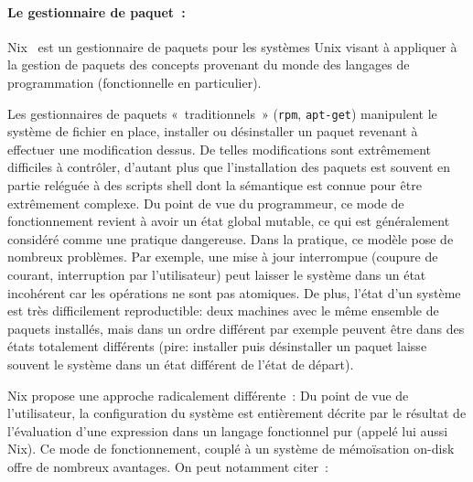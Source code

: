 \paragraph{Le gestionnaire de paquet :}

Nix \cite{phdeelco} est un gestionnaire de paquets pour les systèmes Unix visant à appliquer à
la gestion de paquets des concepts provenant du monde des langages de
programmation (fonctionnelle en particulier).

Les gestionnaires de paquets « traditionnels » (\verb|rpm|, \verb|apt-get|)
manipulent le système de fichier en place, installer ou désinstaller un paquet
revenant à effectuer une modification dessus. De telles modifications sont
extrêmement difficiles à contrôler, d'autant plus que l'installation des
paquets est souvent en partie reléguée à des scripts shell dont la sémantique
est connue pour être extrêmement complexe.
Du point de vue du programmeur, ce mode de fonctionnement revient à avoir un
état global mutable, ce qui est généralement considéré comme une pratique
dangereuse.
Dans la pratique, ce modèle pose de nombreux problèmes. Par exemple, une mise à
jour interrompue (coupure de courant, interruption par l'utilisateur) peut
laisser le système dans un état incohérent car les opérations ne sont pas
atomiques.
De plus, l'état d'un système est très difficilement reproductible: deux
machines avec le même ensemble de paquets installés, mais dans un ordre
différent par exemple peuvent être dans des états totalement différents (pire:
installer puis désinstaller un paquet laisse souvent le système dans un état
différent de l'état de départ).

Nix propose une approche radicalement différente : Du point de vue de
l'utilisateur, la configuration du système est entièrement décrite par le
résultat de l'évaluation d'une expression dans un langage fonctionnel pur
(appelé lui aussi Nix). Ce mode de fonctionnement, couplé à un système de
mémoïsation on-disk offre de nombreux avantages. On peut notamment citer :

